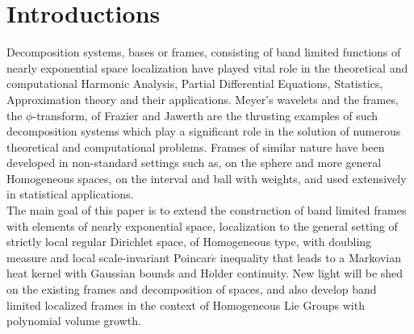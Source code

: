 \documentclass[10pt]{article}
\theoremstyle{definition}
\numberwithin{equation}{section}
\begin{document}
	 \baselineskip 10pt
	\section{Introductions}
	Decomposition systems, bases or frames, consisting of band limited functions of nearly exponential space localization have played vital role in the theoretical and computational Harmonic Analysis, Partial Differential Equations, Statistics, Approximation theory and their applications. Meyer's wavelets and the frames, the $\phi$-transform, of Frazier and Jawerth are the thrusting examples of such decomposition systems which play a significant role in the solution of numerous theoretical and computational problems.  Frames of similar nature have been developed in non-standard settings such as, on the sphere and more general Homogeneous spaces, on the interval and ball with weights, and used extensively in statistical applications.\\
	The main goal of this paper is to extend  the construction of band limited frames with elements of nearly exponential space, localization to the general setting of strictly local regular Dirichlet space, of Homogeneous type, with doubling measure and local scale-invariant Poincar$\acute{e}$ inequality that leads to a Markovian heat kernel with Gaussian bounds and H$\ddot{o}$lder continuity. New light will be shed on the existing frames and decomposition of spaces, and also develop band limited localized frames in the context of Homogeneous Lie Groups with polynomial volume growth.
\end{document}
